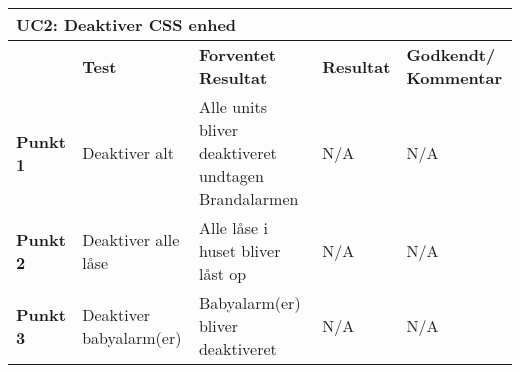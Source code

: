 \begin{table}[htbp] \centering
\begin{tabular}{|p{}|p{}|p{3cm}|p{3cm}|p{3cm}|} %
	\hline
\multicolumn{5}{|l|}{\textbf{UC2: Deaktiver CSS enhed}} \\\hline
&\textbf{Test} &\textbf{Forventet \newline Resultat} &\textbf{Resultat} &\textbf{Godkendt/ \newline Kommentar} \\\hline
\textbf{Punkt 1}	&
Deaktiver alt &
Alle units bliver deaktiveret undtagen Brandalarmen &
N/A &
N/A \\\hline
\textbf{Punkt 2} &
Deaktiver alle låse &
Alle låse i huset bliver låst op &
N/A	&
N/A \\\hline
\textbf{Punkt 3} &
Deaktiver \newline babyalarm(er) &
Babyalarm(er) bliver deaktiveret &
N/A &
N/A \\\hline
	\end{tabular}
	\label{ATUC2} 
\end{table}